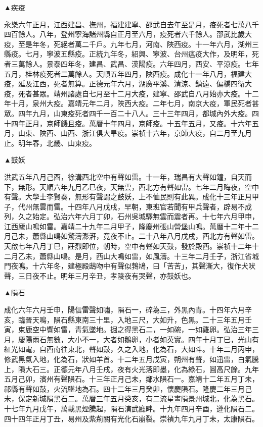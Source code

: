 \begin{pinyinscope}
▲疾疫

永樂六年正月，江西建昌、撫州，福建建寧、邵武自去年至是月，疫死者七萬八千四百餘人。八年，登州寧海諸州縣自正月至六月，疫死者六千餘人。邵武比歲大疫，至是年冬，死絕者萬二千戶。九年七月，河南、陜西疫。十一年六月，湖州三縣疫。七月，寧波五縣疫。正統九年冬，紹興、寧波、台州瘟疫大作，及明年，死者三萬餘人。景泰四年冬，建昌、武昌、漢陽疫。六年四月，西安、平涼疫。七年五月，桂林疫死者二萬餘人。天順五年四月，陜西疫。成化十一年八月，福建大疫，延及江西，死者無算。正德元年六月，湖廣平溪、清涼、鎮遠、偏橋四衛大疫，死者甚眾。靖州諸處自七月至十二月大疫，建寧、邵武自八月始亦大疫。十二年十月，泉州大疫。嘉靖元年二月，陜西大疫。二年七月，南京大疫，軍民死者甚眾。四年九月，山東疫死者四千一百二十八人。三十三年四月，都城內外大疫。四十四年正月，京師饑且疫。萬曆十年四月，京師疫。十五年五月，又疫。十六年五月，山東、陜西、山西、浙江俱大旱疫。崇禎十六年，京師大疫，自二月至九月止。明年春，北畿、山東疫。

▲鼓妖

洪武五年八月己酉，徐溝西北空中有聲如雷。十一年，瑞昌有大聲如鐘，自天而下，無形。天順六年九月乙巳夜，天無雲，西北方有聲如雷。七年二月晦夜，空中有聲。大學士李賢奏，無形有聲謂之鼓妖，上不恤民則有此異。成化十三年正月甲子，代州無雲而雷。十四年八月戊戌，早朝，東班官若聞有甲兵聲者，辟易不成列，久之始定。弘治六年六月丁卯，石州吳城驛無雲而震者再。十七年六月甲申，江西廬山鳴如雷。嘉靖二十九年二月甲子，隆慶州張山營堡山鳴。萬曆十二年十二月己未，蕭縣山鳴如驚濤澎湃，竟夜不止。二十八年八月戊戌，西北方有聲如雷。天啟七年八月丁巳，莊烈即位，朝時，空中有聲如天鼓，發於殿西。崇禎十二年十二月乙未，蕭縣山鳴。是月，西山大鳴如雷，如風濤。十三年二月壬子，浙江省城門夜鳴。十六年冬，建極殿鴟吻中有聲似鵓鳩，曰「苦苦」，其聲漸大，復作犬吠聲，三日夜不止。明年三月辛丑，孝陵夜有哭聲，亦鼓妖也。

▲隕石

成化六年六月壬申，陽信雷聲如嘯，隕石一，碎為三，外黑內青。十四年六月辛亥，臨晉天鳴，隕石縣東南三十里，入地三尺，大如升，色黑。二十三年五月壬寅，束鹿空中響如雷，青氣墜地。掘之得黑石二，一如碗，一如雞卵。弘治三年三月，慶陽雨石無數，大小不一，大者如鵝卵，小者如芡實。四年十月丁巳，光山有紅光如電，自西南往東北，聲如鼓，久之入地，化為石，大如斗。十年二月丙申，修武黑氣入地，化為石，狀如羊首。十二年五月戊寅，朔州有聲，如迅雷，白氣騰上，隕大石三。正德元年八月壬戌，夜有火光落即墨，化為綠石，圓高尺餘。九年五月己卯，濱州有聲隕石。十三年正月己未，鄰水隕石一。嘉靖十二年五月丁未，祁縣有聲如鼓，火流墜地為石。四十二年三月癸卯，懷慶隕石。隆慶二年三月己未，保定新城隕黑石二。萬曆三年五月癸亥，有二流星晝隕景州城北，化為黑石。十七年九月戊午，萬載黑煙騰起，隕石演武廳畔。十九年四月辛酉，遵化隕石二。四十四年正月丁丑，易州及紫荊關有光化石崩裂。崇禎九年九月丁未，太康隕石。


\end{pinyinscope}
